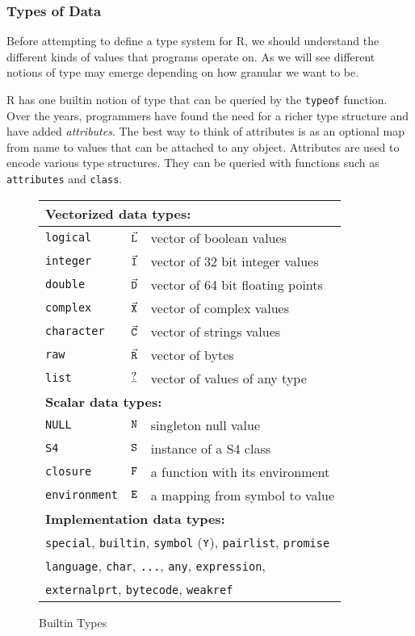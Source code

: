 \documentclass[acmsmall,review,anonymous]{acmart}\settopmatter{printfolios=true,printccs=false,printacmref=false}
\newcommand{\D}{\ensuremath{\small\vec{\mathtt D}}\xspace} %
\newcommand{\I}{\ensuremath{\small\vec{\mathtt I}}\xspace} %
\renewcommand{\C}{\ensuremath{\small\vec{\mathtt C}}\xspace} %
\renewcommand{\L}{\ensuremath{\small\vec{\mathtt L}}\xspace} %
\newcommand{\R}{\ensuremath{\small\vec{\mathtt R}}\xspace} %
\newcommand{\X}{\ensuremath{\small\vec{\mathtt X}}\xspace} %
\newcommand{\sY}{\ensuremath{\small{\mathtt Y}}\xspace} %
\newcommand{\sS}{\ensuremath{\small{\mathtt S}}\xspace} %
\newcommand{\sF}{\ensuremath{\small{\mathtt F}}\xspace} %
\newcommand{\sE}{\ensuremath{\small{\mathtt E}}\xspace} %
\renewcommand{\R}{\ensuremath{\small\vec{\mathtt R}}\xspace} %
\newcommand{\sN}{\ensuremath{\small{\mathtt N}}\xspace}     %
\renewcommand{\l}{\ensuremath{\small\underline{\mathtt ?}}\xspace}     %
\begin{document}
\subsubsection{Types of Data}
\label{subsubsec:backgroundtypes}

Before attempting to define a type system for R, we should understand the
different kinds of values that programs operate on.  As we will see
different notions of type may emerge depending on how granular we want to
be.

\renewcommand{\k}[1]{{\tt #1}\xspace}

R has one builtin notion of type that can be queried by the \k{typeof}
function. Over the years, programmers have found the need for a richer type
structure and have added {\it attributes}. The best way to think of attributes is
as an optional map from name to values that can be attached to any object.
Attributes are used to encode various type structures. They can be queried
with functions such as \k{attributes} and \k{class}.

\begin{wrapfigure}{r}{6.1cm}
\footnotesize\begin{tabular}{l|c|l@{}}\hline
\multicolumn{3}{l}{\bf Vectorized data types:}  \\\hline
\k{logical}   & \L & vector of boolean values\\
\k{integer}   & \I & vector of 32 bit integer values\\
\k{double}    & \D & vector of 64 bit floating points\\
\k{complex}   & \X & vector of complex values\\
\k{character} & \C & vector of strings values\\
\k{raw}       & \R & vector of bytes\\
\k{list}      & \l & vector of values of any type\\\hline
\multicolumn{3}{l}{\bf Scalar data types:}\\\hline
\k{NULL}      & \sN &  singleton null value\\
\k{S4}        & \sS &  instance of a S4 class \\
\k{closure}   & \sF & a function with its environment\\
\k{environment}&\sE &  a mapping from symbol to value \\\hline
\multicolumn{3}{l}{\bf Implementation data types:}\\\hline
\multicolumn{3}{l}{\k{special},
\k{builtin},
\k{symbol} (\sY),
\k{pairlist},
\k{promise}}\\
\multicolumn{3}{l}{
\k{language},
\k{char},
\k{...},
\k{any},
\k{expression},
}\\
\multicolumn{3}{l}{
\k{externalprt},
\k{bytecode},
\k{weakref}}\\\hline
\end{tabular}\caption{Builtin Types}\label{types}\end{wrapfigure}
\end{document}
